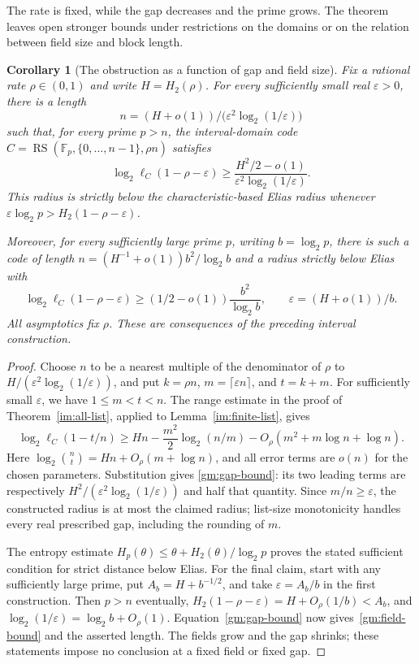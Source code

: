 \documentclass[11pt,letterpaper]{article}
\newtheorem{corollary}[theorem]{Corollary}
\theoremstyle{definition}
\theoremstyle{remark}
\newcommand{\F}{\mathbb F}
\newcommand{\RS}{\operatorname{RS}}
\begin{document}
The rate is fixed, while the gap decreases and the prime grows.
The theorem leaves open stronger bounds under restrictions on the domains
or on the relation between field size and block length.

\begin{corollary}[The obstruction as a function of gap and field size]
\label{gm:gap-field}
Fix a rational rate $\rho\in(0,1)$ and write $H=H_2(\rho)$.
For every sufficiently small real $\varepsilon>0$, there is a length
\[
 n=(H+o(1))\big/\bigl(\varepsilon^2\log_2(1/\varepsilon)\bigr)
\]
such that, for every prime $p>n$, the interval-domain code
$C=\RS(\F_p,\{0,\ldots,n-1\},\rho n)$ satisfies
\begin{equation}\label{gm:gap-bound}
 \log_2\ell_C(1-\rho-\varepsilon)
 \ge \frac{H^2/2-o(1)}
 {\varepsilon^2\log_2(1/\varepsilon)}.
\end{equation}
This radius is strictly below the characteristic-based Elias radius
whenever
$\varepsilon\log_2p>H_2(1-\rho-\varepsilon)$.

Moreover, for every sufficiently large prime $p$, writing $b=\log_2p$,
there is such a code of length
$n=(H^{-1}+o(1))b^2/\log_2b$ and a radius strictly below Elias with
\begin{equation}\label{gm:field-bound}
 \log_2\ell_C(1-\rho-\varepsilon)
 \ge (1/2-o(1))\frac{b^2}{\log_2b},
 \qquad \varepsilon=(H+o(1))/b.
\end{equation}
All asymptotics fix $\rho$. These are consequences of the preceding
interval construction.
\end{corollary}
\begin{proof}
Choose $n$ to be a nearest multiple of the denominator of $\rho$ to
$H/(\varepsilon^2\log_2(1/\varepsilon))$, and put
$k=\rho n$, $m=\lceil\varepsilon n\rceil$, and $t=k+m$.
For sufficiently small $\varepsilon$, we have $1\le m<t<n$.
The range estimate in the proof of Theorem~\ref{im:all-list}, applied
to Lemma~\ref{im:finite-list}, gives
\[
 \log_2\ell_C(1-t/n)
 \ge Hn-\frac{m^2}{2}\log_2(n/m)
       -O_\rho(m^2+m\log n+\log n).
\]
Here $\log_2\binom nt=Hn+O_\rho(m+\log n)$, and all error terms
are $o(n)$ for the chosen parameters. Substitution gives
\eqref{gm:gap-bound}: its two leading terms are respectively
$H^2/(\varepsilon^2\log_2(1/\varepsilon))$ and half that quantity.
Since $m/n\ge\varepsilon$, the constructed radius is at most the
claimed radius; list-size monotonicity handles every real prescribed
gap, including the rounding of $m$.

The entropy estimate
$H_p(\theta)\le\theta+H_2(\theta)/\log_2p$ proves the stated
sufficient condition for strict distance below Elias. For the final
claim, start with any sufficiently large prime, put
$A_b=H+b^{-1/2}$, and take $\varepsilon=A_b/b$ in the first
construction. Then $p>n$ eventually,
$H_2(1-\rho-\varepsilon)=H+O_\rho(1/b)<A_b$, and
$\log_2(1/\varepsilon)=\log_2b+O_\rho(1)$.
Equation~\eqref{gm:gap-bound} now gives~\eqref{gm:field-bound}
and the asserted length. The fields grow and the gap shrinks;
these statements impose no conclusion at a fixed field or fixed gap.
\end{proof}
\end{document}
